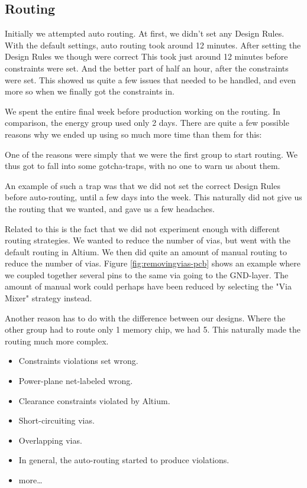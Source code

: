 \subsection {Routing}

Initially we attempted auto routing. At first, we didn't set any Design Rules. With the default settings, auto routing took around 12 minutes. After setting the Design Rules  we though were correct This took just around 12 minutes before constraints were set. And the better part of half an hour, after the constraints were set. This showed us quite a few issues that needed to be handled, and even more so when we finally got the constraints in.

We spent the entire final week before production working on the routing. In comparison, the energy group used only 2 days. There are quite a few possible reasons why we ended up using so much more time than them for this:

One of the reasons were simply that we were the first group to start routing. We thus got to fall into some gotcha-traps, with no one to warn us about them.

An example of such a trap was that we did not set the correct Design Rules before auto-routing, until a few days into the week. This naturally did not give us the routing that we wanted, and gave us a few headaches.

Related to this is the fact that we did not experiment enough with different routing strategies. We wanted to reduce the number of vias, but went with the default routing in Altium. We then did quite an amount of manual routing to reduce the number of vias. Figure \ref{fig:removingvias-pcb} shows an example where we coupled together several pins to the same via going to the GND-layer. The amount of manual work could perhaps have been reduced by selecting the "Via Mixer" strategy instead.


Another reason has to do with the difference between our designs. Where the other group had to route only 1 memory chip, we had 5. This naturally made the routing much more complex.

\begin{itemize}
\item Constraints violations set wrong.
\item Power-plane net-labeled wrong.
\item Clearance constraints violated by Altium.
\item Short-circuiting vias.
\item Overlapping vias.
\item In general, the auto-routing started to produce violations.
\item more\ldots
\end{itemize}

